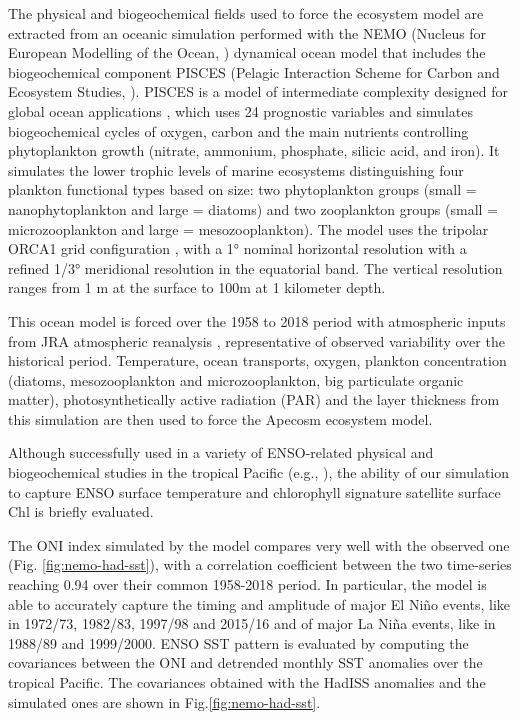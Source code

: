 The physical and biogeochemical fields used to force the ecosystem model are extracted from an oceanic simulation performed with the NEMO (Nucleus for European Modelling of the Ocean, \citealt{madecNEMOOceanEngine2019}) dynamical ocean model that includes the biogeochemical component PISCES (Pelagic Interaction Scheme for Carbon and Ecosystem Studies, \citealt{aumontPISCESv2OceanBiogeochemical2015}). PISCES is a model of intermediate complexity designed for global ocean applications \citep{aumontPISCESv2OceanBiogeochemical2015}, which uses 24 prognostic variables and simulates biogeochemical cycles of oxygen, carbon and the main nutrients controlling phytoplankton growth (nitrate, ammonium, phosphate, silicic acid, and iron). It simulates the lower trophic levels of marine ecosystems distinguishing four plankton functional types based on size: two phytoplankton groups (small = nanophytoplankton and large = diatoms) and two zooplankton groups (small = microzooplankton and large = mesozooplankton). The model uses the tripolar ORCA1 grid configuration \citep{madecGlobalOceanMesh1996}, with a 1° nominal horizontal resolution with a refined 1/3° meridional resolution in the equatorial band. The vertical resolution ranges from 1 m at the surface to 100m at 1 kilometer depth.

This ocean model is forced over the 1958 to 2018 period with atmospheric inputs from JRA atmospheric reanalysis \citep{kobayashiJRA55ReanalysisGeneral2015}, representative of observed variability over the historical period. Temperature, ocean transports, oxygen, plankton concentration (diatoms, mesozooplankton and microzooplankton, big particulate organic matter), photosynthetically active radiation (PAR) and the layer thickness from this simulation are then used to force the Apecosm ecosystem model.

Although successfully used in a variety of ENSO-related physical and biogeochemical studies in the tropical Pacific (e.g., \citealt{vialardModelStudyOceanic2001, lengaigneOceanResponseMarch2002, lengaigneInfluenceOceanicBiology2007, schneiderClimateinducedInterannualVariability2008, masottiLargescaleShiftsPhytoplankton2011, currieIndianOceanDipole2013}), the ability of our simulation to capture ENSO surface temperature and chlorophyll signature satellite surface Chl is briefly evaluated. 

The ONI index simulated by the model compares very well with the observed one (Fig. \ref{fig:nemo-had-sst}), with a correlation coefficient between the two time-series reaching 0.94 over their common 1958-2018 period. In particular, the model is able to accurately capture the timing and amplitude of major El Niño events, like in 1972/73, 1982/83, 1997/98 and 2015/16 and of major La Niña events, like in 1988/89 and 1999/2000. ENSO SST pattern is evaluated  by computing the covariances between the ONI and detrended monthly SST anomalies over the tropical Pacific. The covariances obtained with the HadISS anomalies and the simulated ones are shown in Fig.\ref{fig:nemo-had-sst}.

